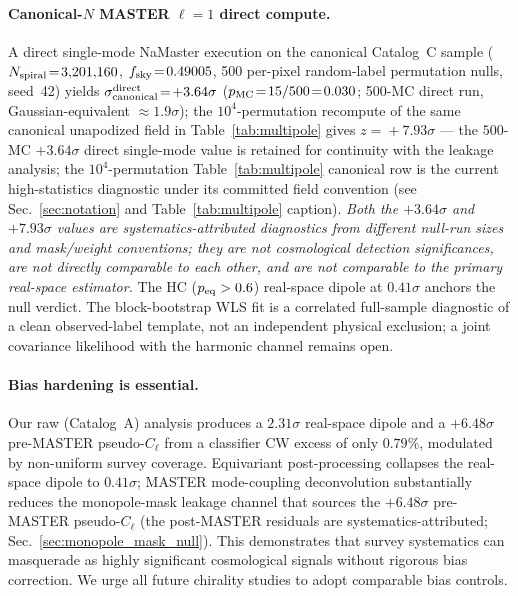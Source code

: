 \documentclass[aps,prd,twocolumn,superscriptaddress,preprintnumbers,nofootinbib,longbibliography,floatfix]{revtex4-2}
\newcommand{\sigmaunit}{\sigma}
\begin{document}
\paragraph{Canonical-$N$ MASTER $\ell\!=\!1$ direct compute.}
A direct single-mode NaMaster execution on the canonical Catalog~C sample ($N_{\rm spiral}\!=\!3{,}201{,}160$, $f_{\rm sky}\!=\!0.49005$, 500 per-pixel random-label permutation nulls, seed~42) yields $\sigma_{\rm canonical}^{\rm direct}\!=\!+3.64\sigmaunit$ ($p_{\rm MC}\!=\!15/500\!=\!0.030$; 500-MC direct run, Gaussian-equivalent $\approx\!1.9\sigmaunit$); the $10^4$-permutation recompute of the same canonical unapodized field in Table~\ref{tab:multipole} gives $z\!=\!+7.93\sigmaunit$ --- the $500$-MC $+3.64\sigmaunit$ direct single-mode value is retained for continuity with the leakage analysis; the $10^4$-permutation Table~\ref{tab:multipole} canonical row is the current high-statistics diagnostic under its committed field convention (see Sec.~\ref{sec:notation} and Table~\ref{tab:multipole} caption). \emph{Both the $+3.64\sigmaunit$ and $+7.93\sigmaunit$ values are systematics-attributed diagnostics from different null-run sizes and mask/weight conventions; they are not cosmological detection significances, are not directly comparable to each other, and are not comparable to the primary real-space estimator.} The HC ($p_{\rm eq}>0.6$) real-space dipole at $0.41\sigmaunit$ anchors the null verdict. The block-bootstrap WLS fit is a correlated full-sample diagnostic of a clean observed-label template, not an independent physical exclusion; a joint covariance likelihood with the harmonic channel remains open.

\paragraph{Bias hardening is essential.}
Our raw (Catalog~A) analysis produces a $2.31\sigmaunit$ real-space dipole and a $+6.48\sigmaunit$ pre-MASTER pseudo-$C_\ell$ from a classifier CW excess of only $0.79\%$, modulated by non-uniform survey coverage. Equivariant post-processing collapses the real-space dipole to $0.41\sigmaunit$; MASTER mode-coupling deconvolution substantially reduces the monopole-mask leakage channel that sources the $+6.48\sigmaunit$ pre-MASTER pseudo-$C_\ell$ (the post-MASTER residuals are systematics-attributed; Sec.~\ref{sec:monopole_mask_null}). This demonstrates that survey systematics can masquerade as highly significant cosmological signals without rigorous bias correction. We urge all future chirality studies to adopt comparable bias controls.
\end{document}
